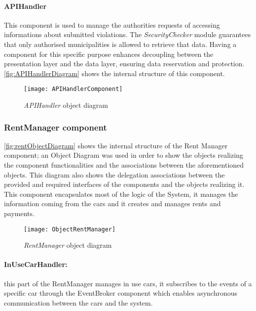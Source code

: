 \paragraph{APIHandler}
This component is used to manage the authorities requests of accessing informations about submitted violations. The \textit{SecurityChecker} module guarantees that only authorised municipalities is allowed to retrieve that data. Having a component for this specific purpose enhances decoupling between the presentation layer and the data layer, ensuring data reservation and protection. \autoref{fig:APIHandlerDiagram} shows the internal structure of this component.\newline\newline
\begin{figure}[h!]
	\centering
	\texttt{[image: APIHandlerComponent]}
	\caption{
		\label{fig:APIHandlerDiagram} 
		\emph{APIHandler} object diagram
	}
\end{figure}
		
\clearpage

\subsubsection{RentManager component}

\autoref{fig:rentObjectDiagram} shows the internal structure of the Rent Manager component; an \mbox{Object} \mbox{Diagram} was used in order to show the objects realizing the component functionalities and the associations between the aforementioned objects. This diagram also shows the delegation associations between the provided and required interfaces of the components and the objects realizing it.
\\
This component encapsulates most of the logic of the System, it manages the information coming from the cars and it creates and manages rents and payments. 

\begin{figure}[h!]
	\centering
	\texttt{[image: ObjectRentManager]}
	\caption{
		\label{fig:rentObjectDiagram} 
		\emph{RentManager} object diagram
	}
\end{figure}

\paragraph{InUseCarHandler:} this part of the RentManager manages in use cars, it subscribes to the events of a specific car through the EventBroker component which enables asynchronous communication between the cars and the system.
